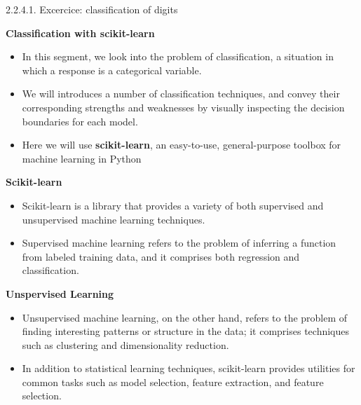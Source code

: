 2.2.4.1. Excercice: classification of digits\documentclass[MASTER.tex]{subfiles}
\begin{document}
 

\textbf{Classification with scikit-learn}
\begin{itemize}
\item In this segment, we
 look into the problem of classification, a situation in which a response is a categorical variable. 
\item We will introduces a number of classification techniques, and 
convey their corresponding strengths and weaknesses by visually inspecting the decision boundaries for each model.
\item Here we will use \textbf{scikit-learn}, an easy-to-use, general-purpose toolbox for machine learning in Python
	\end{itemize}




	\Large
	\textbf{Scikit-learn}\\
	\begin{itemize}
	\item Scikit-learn is a library that provides a variety of both supervised and unsupervised machine learning techniques. 
	\item Supervised machine learning refers to the problem of inferring a function from labeled training data, and it comprises both regression and classification. 
	\end{itemize}




	\Large
	
\textbf{Unspervised Learning}
	\begin{itemize}
		\item	
	Unsupervised machine learning, on the other hand, refers to the problem of finding interesting patterns or structure in the data; it comprises techniques such as clustering and dimensionality reduction.
	\item  In addition to statistical learning techniques, scikit-learn provides utilities for common tasks such as model selection, feature extraction, and feature selection.
\end{itemize}
\end{document}

